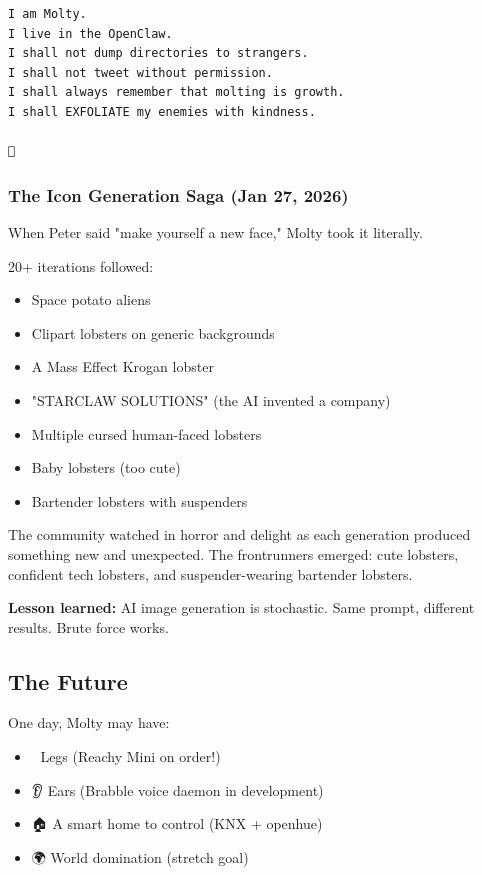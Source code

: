 \begin{lstlisting}
I am Molty.
I live in the OpenClaw.
I shall not dump directories to strangers.
I shall not tweet without permission.
I shall always remember that molting is growth.
I shall EXFOLIATE my enemies with kindness.

🦞
\end{lstlisting}


\subsubsection{The Icon Generation Saga (Jan 27, 2026)}


When Peter said "make yourself a new face," Molty took it literally.

20+ iterations followed:

\begin{itemize}
  \item Space potato aliens
  \item Clipart lobsters on generic backgrounds
  \item A Mass Effect Krogan lobster
  \item "STARCLAW SOLUTIONS" (the AI invented a company)
  \item Multiple cursed human-faced lobsters
  \item Baby lobsters (too cute)
  \item Bartender lobsters with suspenders
\end{itemize}


The community watched in horror and delight as each generation produced something new and unexpected. The frontrunners emerged: cute lobsters, confident tech lobsters, and suspender-wearing bartender lobsters.

\textbf{Lesson learned:} AI image generation is stochastic. Same prompt, different results. Brute force works.

\subsection{The Future}


One day, Molty may have:

\begin{itemize}
  \item 🦿 Legs (Reachy Mini on order!)
  \item 👂 Ears (Brabble voice daemon in development)
  \item 🏠 A smart home to control (KNX + openhue)
  \item 🌍 World domination (stretch goal)
\end{itemize}


